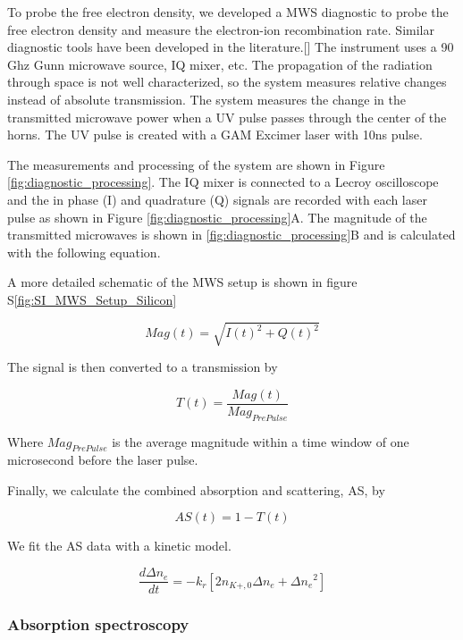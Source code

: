To probe the free electron density, we developed a MWS diagnostic to probe the free electron density and measure the electron-ion recombination rate. Similar diagnostic tools have been developed in the literature.[] The instrument uses a 90 Ghz Gunn microwave source, IQ mixer, etc. The propagation of the radiation through space is not well characterized, so the system measures relative changes instead of absolute transmission. The system measures the change in the transmitted microwave power when a UV pulse passes through the center of the horns. The UV pulse is created with a GAM Excimer laser with 10ns pulse. 

The measurements and processing of the system are shown in Figure \ref{fig:diagnostic_processing}. The IQ mixer is connected to a Lecroy oscilloscope and the in phase (I) and quadrature (Q) signals are recorded with each laser pulse as shown in Figure \ref{fig:diagnostic_processing}A. The magnitude of the transmitted microwaves is shown in \ref{fig:diagnostic_processing}B and is calculated with the following equation.

A more detailed schematic of the MWS setup is shown in figure S\ref*{fig:SI_MWS_Setup_Silicon}

\begin{equation}
    Mag(t) = \sqrt{I(t)^2 + Q(t)^2}
\end{equation}

The signal is then converted to a transmission by 

\begin{equation}
    T(t) = \frac{Mag(t)}{Mag_{Pre Pulse}}
\end{equation}

Where $Mag_{Pre Pulse}$ is the average magnitude within a time window of one microsecond before the laser pulse. 

Finally, we calculate the combined absorption and scattering, AS, by

\begin{equation}
    AS(t) = 1 - T(t)
\end{equation}

We fit the AS data with a kinetic model. 

\begin{equation}
    \frac{d\Delta n_e}{dt} = - k_r [2 n_{K+,0}\Delta n_e + \Delta{n_e}^2]
\end{equation}

\subsubsection{Absorption spectroscopy}

